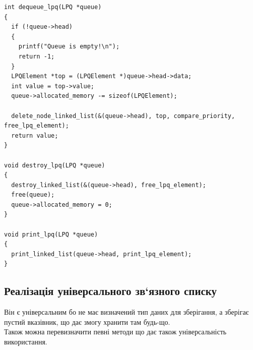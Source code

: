 \begin{lstlisting}[style=customc]
int dequeue_lpq(LPQ *queue)
{
  if (!queue->head)
  {
    printf("Queue is empty!\n");
    return -1;
  }
  LPQElement *top = (LPQElement *)queue->head->data;
  int value = top->value;
  queue->allocated_memory -= sizeof(LPQElement);

  delete_node_linked_list(&(queue->head), top, compare_priority, free_lpq_element);
  return value;
}

void destroy_lpq(LPQ *queue)
{
  destroy_linked_list(&(queue->head), free_lpq_element);
  free(queue);
  queue->allocated_memory = 0;
}

void print_lpq(LPQ *queue)
{
  print_linked_list(queue->head, print_lpq_element);
}
\end{lstlisting}


\clearpage
\subsection{Реалізація універсального зв`язного списку}
  Він є універсальним бо не має визначений тип даних для зберігання,
а зберігає пустий вказівник, що дає змогу хранити там будь-що. \\

Також можна перевизначити певні методи що дає також універсальність використання.

